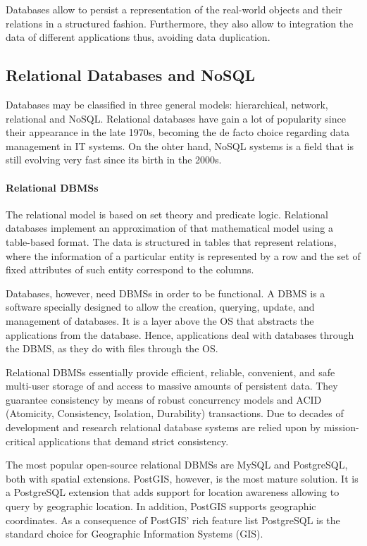 Databases allow to persist a representation of the real-world objects and their relations in a structured fashion. Furthermore, they also allow to integration the data of different applications thus, avoiding data duplication. 

\subsection{Relational Databases and NoSQL}

Databases may be classified in three general models: hierarchical, network, relational and NoSQL. Relational databases have gain a lot of popularity since their appearance in the late 1970s, becoming the de facto choice regarding data management in IT systems. On the ohter hand, NoSQL systems is a field that is still evolving very fast since its birth in the 2000s.

\paragraph{Relational DBMSs}

The relational model is based on set theory and predicate logic. Relational databases implement an approximation of that mathematical model using a table-based format. The data is structured in tables that represent relations, where the information of a particular entity is represented by a row and the set of fixed attributes of such entity correspond to the columns.

Databases, however, need DBMSs in order to be functional. A DBMS is a software specially designed to allow the creation, querying, update, and management of databases. It is a layer above the OS that abstracts the applications from the database. Hence, applications deal with databases through the DBMS, as they do with files through the OS.

Relational DBMSs essentially provide efficient, reliable, convenient, and safe multi-user storage of and access to massive amounts of persistent data. They guarantee consistency by means of robust concurrency models and ACID (Atomicity, Consistency, Isolation, Durability) transactions. Due to decades of development and research relational database systems are relied upon by mission-critical applications that demand strict consistency.

The most popular open-source relational DBMSs are MySQL and PostgreSQL, both with spatial extensions. PostGIS, however, is the most mature solution. It is a PostgreSQL extension that adds support for location awareness allowing to query by geographic location. In addition, PostGIS supports geographic coordinates. As a consequence of PostGIS' rich feature list PostgreSQL is the standard choice for Geographic Information Systems (GIS).

